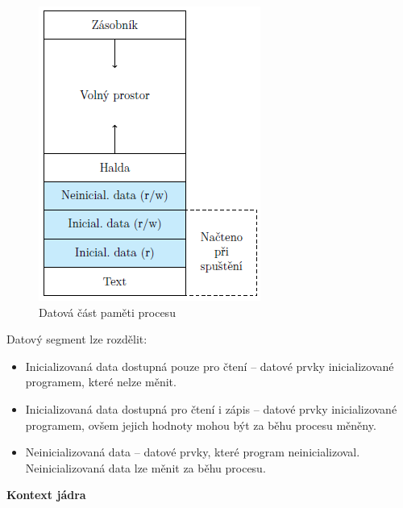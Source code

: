 \begin{figure}[H]
\begin{minipage}[b]{0.4\textwidth}
    \includegraphics[width=\textwidth]{images/proc_data_segment.png}
    \caption{Datová část paměti procesu}
  \end{minipage}
\end{figure}

Datový segment lze rozdělit:

\begin{itemize}
    \item  Inicializovaná data dostupná pouze pro čtení – datové prvky inicializované programem,
    které nelze měnit.
    \item Inicializovaná data dostupná pro čtení i zápis – datové prvky inicializované programem,
    ovšem jejich hodnoty mohou být za běhu procesu měněny.
    \item Neinicializovaná data – datové prvky, které program neinicializoval. Neinicializovaná
    data lze měnit za běhu procesu.
\end{itemize}

\begin{Large}
    \vspace{0,5cm}
    \textbf{Kontext jádra}
\end{Large}

